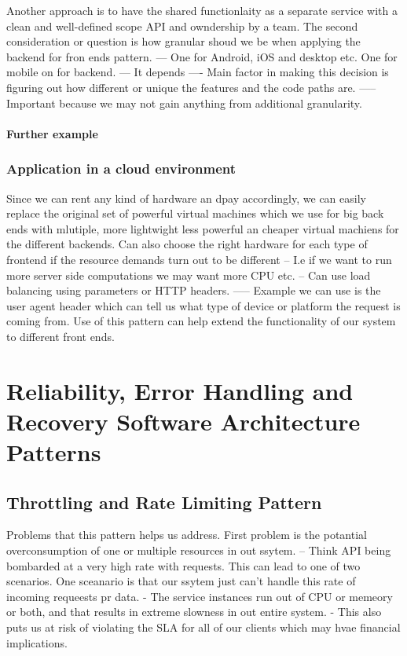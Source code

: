 \documentclass[a4paper, 11pt]{book}
\begin{document}
{    Another approach is to have the shared functionlaity as a separate service with a clean and well-defined scope API and owndership by a team.
    The second consideration or question is how granular shoud we be when applying the backend for fron ends pattern.
    --- One for Android, iOS and desktop etc. One for mobile on for backend.
    --- It depends
    ---- Main factor in making this decision is figuring out how different or unique the features and the code paths are.
    ----- Important because we may not gain anything from additional granularity.

    \paragraph{Further example}

    \subsubsection{Application in a cloud environment}
    Since we can rent any kind of hardware an dpay accordingly, we can easily replace the original set of powerful virtual machines which we use for big back ends with mlutiple, more lightwight less powerful an cheaper virtual machiens for the different backends.
    Can also choose the right hardware for each type of frontend if the resource demands turn out to be different
    -- I.e if we want to run more server side computations we may want more CPU etc.
    -- Can use load balancing using parameters or HTTP headers.
    ----- Example we can use is the user agent header which can tell us what type of device or platform the request is coming from.
    Use of this pattern can help extend the functionality of our system to different front ends.


    \section{Reliability, Error Handling and Recovery Software Architecture Patterns}

    \subsection{Throttling and Rate Limiting Pattern}
    Problems that this pattern helps us address.
    First problem is the potantial overconsumption of one or multiple resources in out ssytem.
    -- Think API being bombarded at a very high rate with requests.
    This can lead to one of two scenarios.
    One sceanario is that our ssytem just can't handle this rate of incoming requeests pr data.
    - The service instances run out of CPU or memeory or both, and that results in extreme slowness in out entire system.
    - This also puts us at risk of violating the SLA for all of our clients which may hvae financial implications.

}
\end{document}

